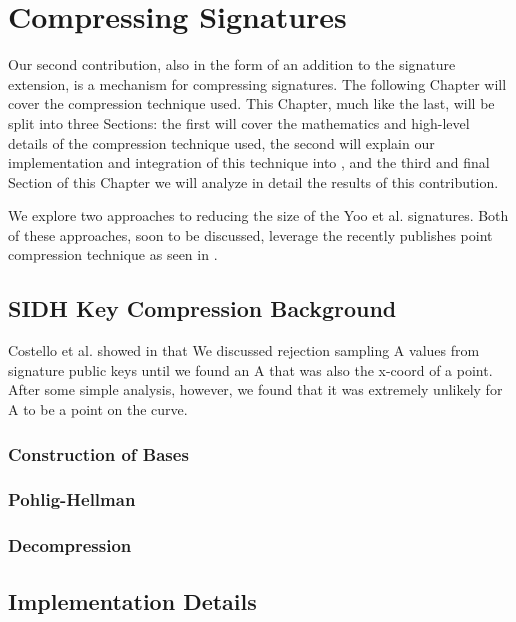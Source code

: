\chapter{Compressing Signatures}
\label{sec:compress}

Our second contribution, also in the form of an addition to the \sidh signature extension, is a mechanism for compressing signatures. The following Chapter will cover the compression technique used. This Chapter, much like the last, will be split into three Sections: the first will cover the mathematics and high-level details of the compression technique used, the second will explain our implementation and integration of this technique into \sidh, and the third and final Section of this Chapter we will analyze in detail the results of this contribution.

We explore two approaches to reducing the size of the Yoo et al. signatures. Both of these approaches, soon to be discussed, leverage the recently publishes point compression technique as seen in \cite{pkcomp}. 



\section{SIDH Key Compression Background}

Costello et al. showed in \cite{pkcomp} that  
We discussed rejection sampling A values from signature public keys until we found an A that was also the x-coord of a point. After some simple analysis, however, we found that it was extremely unlikely for A to be a point on the curve.

\subsection{Construction of Bases}

\subsection{Pohlig-Hellman}

\subsection{Decompression}

\section{Implementation Details}
\label{sec:compimplementation}

